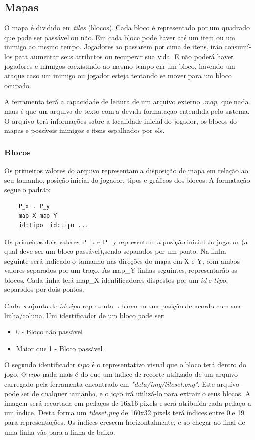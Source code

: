 \subsection{Mapas}

O mapa é dividido em \textit{tiles} (blocos). Cada bloco é representado por um quadrado que pode ser passável ou não. Em cada bloco pode haver até um item ou um inimigo ao mesmo tempo. Jogadores ao passarem por cima de itens, irão consumí-los para aumentar seus atributos ou recuperar sua vida. E não poderá haver jogadores e inimigos coexistindo ao mesmo tempo em um bloco, havendo um ataque caso um inimigo ou jogador esteja tentando se mover para um bloco ocupado.

A ferramenta terá a capacidade de leitura de um arquivo externo \textit{.map}, que nada mais é que um arquivo de texto com a devida formatação entendida pelo sistema. O arquivo terá informações sobre a localidade inicial do jogador, os blocos do mapas e possíveis inimigos e itens espalhados por ele.

\subsubsection{Blocos}
Os primeiros valores do arquivo representam a disposição do mapa em relação ao seu tamanho, posição inicial do jogador, tipos e gráficos dos blocos.
A formatação segue o padrão:
\begin{verbatim}
	P_x . P_y
	map_X-map_Y
	id:tipo  id:tipo ...
\end{verbatim}
	
Os primeiros dois valores P\_x e P\_y representam a posição inicial do jogador (a qual deve ser um bloco passável),sendo separados por um ponto.
Na linha seguinte será indicado o tamanho nas direções do mapa em X e Y, com ambos valores separados por um traço.
As map\_Y linhas seguintes, representarão os blocos. Cada linha terá map\_X identificadores dispostos por um $id$ e $tipo$, separados por dois-pontos. 

Cada conjunto de $id:tipo$ representa o bloco na sua posição de acordo com sua linha/coluna.
Um identificador de um bloco pode ser: 

	\begin{itemize}
		\item 0 - Bloco não passável
		\item Maior que 1 - Bloco passável
	\end{itemize}

O segundo identificador $tipo$ é o representativo visual que o bloco terá dentro do jogo. O $tipo$ nada mais é do que um índice de recorte utilizado de um arquivo carregado pela ferramenta encontrado em \textit{"data/img/tileset.png"}. Este arquivo pode ser de qualquer tamanho, e o jogo irá utilizá-lo para extrair o seus blocos. A imagem será recortada em pedaços de 16x16 pixels e será atribuída cada pedaço a um índice. Desta forma um \textit{tileset.png} de 160x32 pixels terá índices entre 0 e 19 para representações. Os índices crescem horizontalmente, e ao chegar ao final de uma linha  vão para a linha de baixo.  

